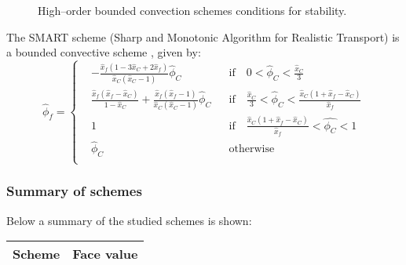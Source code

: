 \begin{figure}[h]
	\centering
	\captionsetup{width=0.5\textwidth}
	\caption{High--order bounded convection schemes conditions for stability.}
	\label{fig:stability_accuracy_conditions_scheme}
\end{figure}

The SMART scheme (Sharp and Monotonic Algorithm for Realistic Transport) is a bounded convective scheme \cite{gaskell1988curvature}, given by:
\begin{equation}
	\hat{\phi}_f = 
	\left\{
	\begin{aligned}
		&-\frac{\hat{x}_f (1 - 3 \hat{x}_C + 2 \hat{x}_f)}{\hat{x}_C (\hat{x}_C - 1)} \hat{\phi}_C & 
		&\text{if} \quad 0 < \hat{\phi}_C < \frac{\hat{x}_C}{3} \\
		&\frac{\hat{x}_f (\hat{x}_f - \hat{x}_C)}{1 - \hat{x}_C} + \frac{\hat{x}_f (\hat{x}_f - 1)}{\hat{x}_C (\hat{x}_C - 1)} \hat{\phi}_C &
		&\text{if} \quad \frac{\hat{x}_C}{3} < \hat{\phi}_C <  \frac{\hat{x}_C (1 + \hat{x}_f - \hat{x}_C)}{\hat{x}_f} \\
		&1 & &\text{if} \quad \frac{\hat{x}_C (1 + \hat{x}_f - \hat{x}_C)}{\hat{x}_f} < \hat{\phi_C} < 1 \\
		&\hat{\phi}_C & &\text{otherwise} \\
	\end{aligned}
	\right.
\end{equation}

\subsubsection{Summary of schemes}

Below a summary of the studied schemes is shown:

\begin{table}[h]
	\centering
	\begin{tabular}{ll}
		\toprule[0.50mm]
		\textbf{Scheme} & \textbf{Face value} \\
		\midrule[0.25mm]
		
		\bottomrule[0.50mm]
	\end{tabular}
\end{table}